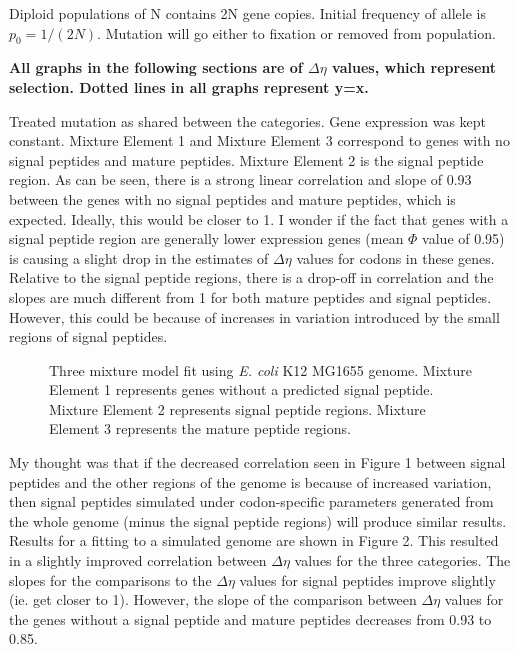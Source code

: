 \documentclass[11pt]{labbook}
\begin{document}
Diploid populations of N contains 2N gene copies. Initial frequency of allele is $p_0 = 1/(2N)$. Mutation will go either to fixation or removed from population. 





 

\textbf{All graphs in the following sections are of $\Delta\eta$ values, which represent selection. Dotted lines in all graphs represent y=x.}

Treated mutation as shared between the categories. Gene expression was kept constant. Mixture Element 1 and Mixture Element 3 correspond to genes with no signal peptides and mature peptides. Mixture Element 2 is the signal peptide region. As can be seen, there is a strong linear correlation and slope of 0.93 between the genes with no signal peptides and mature peptides, which is expected. Ideally, this would be closer to 1. I wonder if the fact that genes with a signal peptide region are generally lower expression genes (mean $\Phi$ value of 0.95) is causing a slight drop in the estimates of $\Delta\eta$ values for codons in these genes. Relative to the signal peptide regions, there is a drop-off in correlation and the slopes are much different from 1 for both mature peptides and signal peptides. However, this could be because of increases in variation introduced by the small regions of signal peptides.
\begin{figure}
\caption{Three mixture model fit using \textit{E. coli} K12 MG1655 genome. Mixture Element 1 represents genes without a predicted signal peptide. Mixture Element 2 represents signal peptide regions. Mixture Element 3 represents the mature peptide regions.}
\end{figure}
My thought was that if the decreased correlation seen in Figure 1 between signal peptides and the other regions of the genome is because of increased variation, then signal peptides simulated under codon-specific parameters generated from the whole genome (minus the signal peptide regions) will produce similar results. Results for a fitting to a simulated genome are shown in Figure 2. This resulted in a slightly improved correlation between $\Delta\eta$ values for the three categories. The slopes for the comparisons to the $\Delta\eta$ values for signal peptides improve slightly (ie. get closer to 1). However, the slope of the comparison between $\Delta\eta$ values for the genes without a signal peptide and mature peptides decreases from 0.93 to 0.85.
\end{document}
